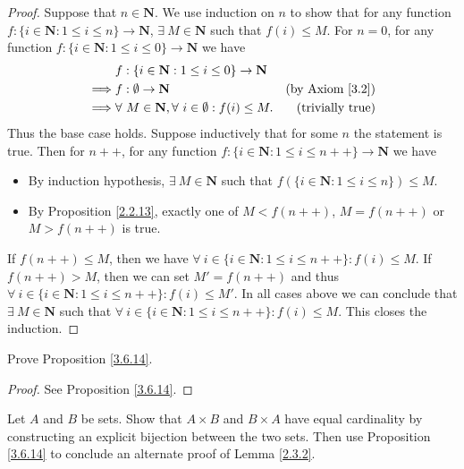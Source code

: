 \begin{proof}
    Suppose that \(n \in \mathbf{N}\).
    We use induction on \(n\) to show that for any function \(f : \{i \in \mathbf{N} : 1 \leq i \leq n\} \to \mathbf{N}\), \(\exists\ M \in \mathbf{N}\) such that \(f(i) \leq M\).
    For \(n = 0\), for any function \(f : \{i \in \mathbf{N} : 1 \leq i \leq 0\} \to \mathbf{N}\) we have
    \begin{align*}
                 & f : \{i \in \mathbf{N} : 1 \leq i \leq 0\} \to \mathbf{N}                                        \\
        \implies & f : \emptyset \to \mathbf{N}                                       & \text{(by Axiom \ref{3.2})} \\
        \implies & \forall\ M \in \mathbf{N}, \forall\ i \in \emptyset : f(i) \leq M. & \text{(trivially true)}     \\
    \end{align*}
    Thus the base case holds.
    Suppose inductively that for some \(n\) the statement is true.
    Then for \(n++\), for any function \(f : \{i \in \mathbf{N} : 1 \leq i \leq n++\} \to \mathbf{N}\) we have
    \begin{itemize}
        \item By induction hypothesis, \(\exists\ M \in \mathbf{N}\) such that \(f(\{i \in \mathbf{N} : 1 \leq i \leq n\}) \leq M\).
        \item By Proposition \ref{2.2.13}, exactly one of \(M < f(n++)\), \(M = f(n++)\) or \(M > f(n++)\) is true.
    \end{itemize}
    If \(f(n++) \leq M\), then we have \(\forall\ i \in \{i \in \mathbf{N} : 1 \leq i \leq n++\} : f(i) \leq M\).
    If \(f(n++) > M\), then we can set \(M' = f(n++)\) and thus \(\forall\ i \in \{i \in \mathbf{N} : 1 \leq i \leq n++\} : f(i) \leq M'\).
    In all cases above we can conclude that \(\exists\ M \in \mathbf{N}\) such that \(\forall\ i \in \{i \in \mathbf{N} : 1 \leq i \leq n++\} : f(i) \leq M\).
    This closes the induction.
\end{proof}

\begin{exercise}\label{ex 3.6.4}
    Prove Proposition \ref{3.6.14}.
\end{exercise}

\begin{proof}
    See Proposition \ref{3.6.14}.
\end{proof}

\begin{exercise}\label{ex 3.6.5}
    Let \(A\) and \(B\) be sets.
    Show that \(A \times B\) and \(B \times A\) have equal cardinality by constructing an explicit bijection between the two sets.
    Then use Proposition \ref{3.6.14} to conclude an alternate proof of Lemma \ref{2.3.2}.
\end{exercise}

